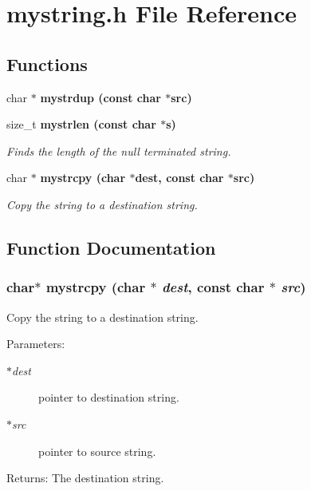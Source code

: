 \section{mystring.h File Reference}
\label{mystring_8h}
\subsection*{Functions}
\begin{CompactItemize}
\item 
char $\ast$ \bf{mystrdup} (const char $\ast$src)
\item 
size\_\-t \bf{mystrlen} (const char $\ast$s)
\begin{CompactList}\small\item\em Finds the length of the null terminated string. \item\end{CompactList}\item 
char $\ast$ \bf{mystrcpy} (char $\ast$dest, const char $\ast$src)
\begin{CompactList}\small\item\em Copy the string to a destination string. \item\end{CompactList}\end{CompactItemize}


\subsection{Function Documentation}
\subsubsection{\setlength{\rightskip}{0pt plus 5cm}char$\ast$ mystrcpy (char $\ast$ {\em dest}, const char $\ast$ {\em src})}\label{mystring_8h_515b2c58f31e99a4564e463ffbf73e2f}


Copy the string to a destination string. 

\begin{Desc}
\item[Parameters:]
\begin{description}
\item[{\em $\ast$dest}]pointer to destination string. \item[{\em $\ast$src}]pointer to source string. \end{description}
\end{Desc}
\begin{Desc}
\item[Returns:]The destination string. \end{Desc}
